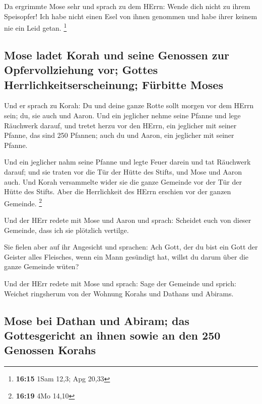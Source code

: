  Da ergrimmte Mose sehr und sprach zu dem HErrn: Wende
dich nicht zu ihrem Speisopfer! Ich habe nicht einen Esel von ihnen
genommen und habe ihrer keinem nie ein Leid getan. \footnote{\textbf{16:15}
  1Sam 12,3; Apg 20,33}

\hypertarget{mose-ladet-korah-und-seine-genossen-zur-opfervollziehung-vor-gottes-herrlichkeitserscheinung-fuxfcrbitte-moses}{%
\subsection{Mose ladet Korah und seine Genossen zur Opfervollziehung
vor; Gottes Herrlichkeitserscheinung; Fürbitte
Moses}\label{mose-ladet-korah-und-seine-genossen-zur-opfervollziehung-vor-gottes-herrlichkeitserscheinung-fuxfcrbitte-moses}}

 Und er sprach zu Korah: Du und deine ganze Rotte sollt
morgen vor dem HErrn sein; du, sie auch und Aaron.  Und
ein jeglicher nehme seine Pfanne und lege Räuchwerk darauf, und tretet
herzu vor den HErrn, ein jeglicher mit seiner Pfanne, das sind 250
Pfannen; auch du und Aaron, ein jeglicher mit seiner Pfanne.

 Und ein jeglicher nahm seine Pfanne und legte Feuer
darein und tat Räuchwerk darauf; und sie traten vor die Tür der Hütte
des Stifts, und Mose und Aaron auch.  Und Korah
versammelte wider sie die ganze Gemeinde vor der Tür der Hütte des
Stifts. Aber die Herrlichkeit des HErrn erschien vor der ganzen
Gemeinde. \footnote{\textbf{16:19} 4Mo 14,10}

 Und der HErr redete mit Mose und Aaron und sprach:
 Scheidet euch von dieser Gemeinde, dass ich sie
plötzlich vertilge.

 Sie fielen aber auf ihr Angesicht und sprachen: Ach
Gott, der du bist ein Gott der Geister alles Fleisches, wenn ein Mann
gesündigt hat, willst du darum über die ganze Gemeinde wüten?

 Und der HErr redete mit Mose und sprach: 
Sage der Gemeinde und sprich: Weichet ringsherum von der Wohnung Korahs
und Dathans und Abirams.

\hypertarget{mose-bei-dathan-und-abiram-das-gottesgericht-an-ihnen-sowie-an-den-250-genossen-korahs}{%
\subsection{Mose bei Dathan und Abiram; das Gottesgericht an ihnen sowie
an den 250 Genossen
Korahs}\label{mose-bei-dathan-und-abiram-das-gottesgericht-an-ihnen-sowie-an-den-250-genossen-korahs}}

